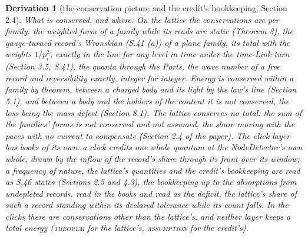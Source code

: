 \documentclass[pdflatex,sn-mathphys-num]{sn-jnl}
\newcommand{\claimmark}[1]{\textup{\textsc{#1}}}
\theoremstyle{thmstyleone}
\newtheorem{derivation}{Derivation}
\begin{document}
\begin{derivation}[the conservation picture and the credit's bookkeeping, Section 2.4]
\emph{What is conserved, and where.} On the lattice the conservations are per family: the weighted form of a family while its reads are static (Theorem 3), the gauge-turned record's Wronskian (S.41 (a)) of a plane family, its total with the weights $1 / p_i^2$, exactly in the line for any level in time under the time-Link turn (Section 3.5, S.41), the quanta through the Ports, the wave number of a free record and reversibility exactly, integer for integer. Energy is conserved within a family by theorem, between a charged body and its light by the law's line (Section 5.1), and between a body and the holders of the content it is not conserved, the loss being the mass defect (Section 8.1). The lattice conserves no total: the sum of the families' forms is not conserved and not assumed, the share moving with the paces with no current to compensate (Section 2.4 of the paper). The click layer has books of its own: a click credits one whole quantum at the NodeDetector's own whole, drawn by the inflow of the record's share through its front over its window; a frequency of nature, the lattice's quantities and the credit's bookkeeping are read as S.46 states (Sections 2.5 and 4.3), the bookkeeping up to the absorptions from undepleted records, read in the books and read as the deficit, the lattice's share of such a record standing within its declared tolerance while its count falls. In the clicks there are conservations other than the lattice's, and neither layer keeps a total energy (\claimmark{theorem} for the lattice's, \claimmark{assumption} for the credit's).


\end{derivation}
\end{document}

